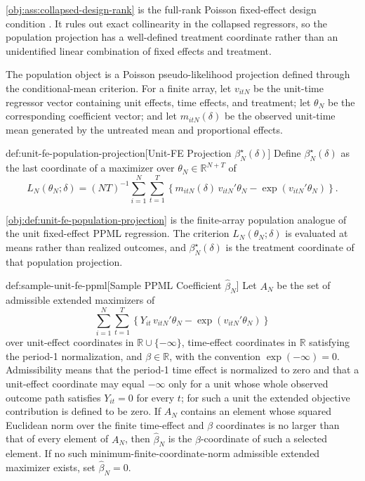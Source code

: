 \documentclass[11pt]{article}
\begin{document}
\cref{obj:ass:collapsed-design-rank} is the full-rank Poisson fixed-effect design condition \citep{White1982MisspecifiedML}. It rules out exact collinearity in the collapsed regressors, so the population projection has a well-defined treatment coordinate rather than an unidentified linear combination of fixed effects and treatment.

The population object is a Poisson pseudo-likelihood projection defined through the conditional-mean criterion. For a finite array, let \(v_{itN}\) be the unit-time regressor vector containing unit effects, time effects, and treatment; let \(\theta_N\) be the corresponding coefficient vector; and let \(m_{itN}(\delta)\) be the observed unit-time mean generated by the untreated mean and proportional effects.

\begin{definitionv}{def:unit-fe-population-projection}[Unit-FE Projection \(\beta_N^\star(\delta)\)]
Define \(\beta_N^\star(\delta)\) as the last coordinate of a maximizer over \(\theta_N\in\mathbb R^{N+T}\) of
\[
L_N(\theta_N;\delta)
=
(NT)^{-1}\sum_{i=1}^N\sum_{t=1}^T
\left\{
m_{itN}(\delta)\,v_{itN}'\theta_N-\exp(v_{itN}'\theta_N)
\right\}.
\]
\end{definitionv}

\cref{obj:def:unit-fe-population-projection} is the finite-array population analogue of the unit fixed-effect PPML regression. The criterion \(L_N(\theta_N;\delta)\) is evaluated at means rather than realized outcomes, and \(\beta_N^\star(\delta)\) is the treatment coordinate of that population projection.

\begin{definitionv}{def:sample-unit-fe-ppml}[Sample PPML Coefficient \(\hat\beta_N\)]
Let \(A_N\) be the set of admissible extended maximizers of
\[
\sum_{i=1}^N\sum_{t=1}^T
\left\{
Y_{it}\,v_{itN}'\theta_N-\exp(v_{itN}'\theta_N)
\right\}
\]
over unit-effect coordinates in \(\mathbb R\cup\{-\infty\}\), time-effect coordinates in \(\mathbb R\) satisfying the period-1 normalization, and \(\beta\in\mathbb R\), with the convention \(\exp(-\infty)=0\). Admissibility means that the period-1 time effect is normalized to zero and that a unit-effect coordinate may equal \(-\infty\) only for a unit whose whole observed outcome path satisfies \(Y_{it}=0\) for every \(t\); for such a unit the extended objective contribution is defined to be zero. If \(A_N\) contains an element whose squared Euclidean norm over the finite time-effect and \(\beta\) coordinates is no larger than that of every element of \(A_N\), then \(\hat\beta_N\) is the \(\beta\)-coordinate of such a selected element. If no such minimum-finite-coordinate-norm admissible extended maximizer exists, set \(\hat\beta_N=0\).
\end{definitionv}
\end{document}

